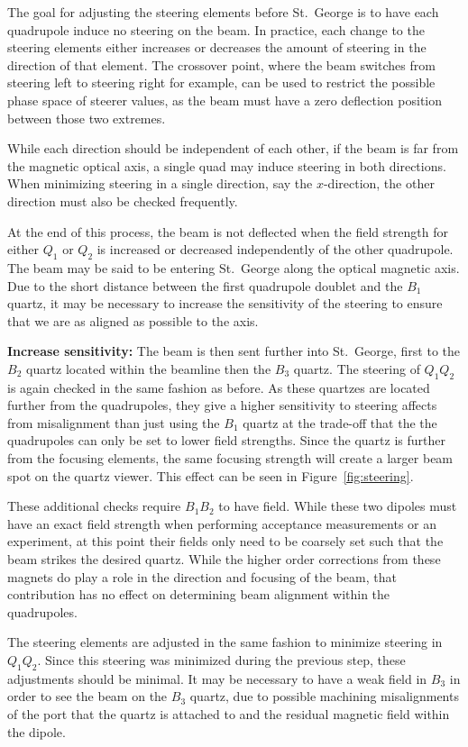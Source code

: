 The goal for adjusting the steering elements before St.\ George is to have each
quadrupole induce no steering on the beam. In practice, each change to the
steering elements either increases or decreases the amount of steering in the
direction of that element.
The crossover point, where the beam switches from steering left to steering
right for example, can be used to restrict the possible phase space of steerer
values, as the beam must have a zero deflection position between those two
extremes.

While each direction should be independent of each other, if the beam is far
from the magnetic optical axis, a single quad may induce steering in both
directions. When minimizing steering in a single direction, say the
$x$-direction, the other direction must also be checked frequently.

At the end of this process, the beam is not deflected when the field strength
for either $Q_1$ or $Q_2$ is increased or decreased independently of the other
quadrupole. The beam may be said to be entering St.\ George along the optical
magnetic axis. Due to the short distance between the first quadrupole doublet
and the $B_1$ quartz, it may be necessary to increase the sensitivity of the
steering to ensure that we are as aligned as possible to the axis.

\textbf{Increase sensitivity:}
The beam is then sent further into St.\ George, first to the $B_2$ quartz
located within the beamline then the $B_3$ quartz. The steering of $Q_1Q_2$ is
again checked in the same fashion as before. As these quartzes are located
further from the quadrupoles, they give a higher sensitivity to steering
affects from misalignment than just using the $B_1$ quartz at the trade-off
that the the quadrupoles can only be set to lower field strengths. Since the
quartz is further from the focusing elements, the same focusing strength will
create a larger beam spot on the quartz viewer. This effect can be seen in
Figure~\ref{fig:steering}.

These additional checks require $B_1B_2$ to have field. While these two dipoles
must have an exact field strength when performing acceptance measurements or an
experiment, at this point their fields only need to be coarsely set such that
the beam strikes the desired quartz. While the higher order corrections from
these magnets do play a role in the direction and focusing of the beam, that
contribution has no effect on determining beam alignment within the
quadrupoles.

The steering elements are adjusted in the same fashion to minimize steering in
$Q_1Q_2$. Since this steering was minimized during the previous step, these
adjustments should be minimal. It may
be necessary to have a weak field in $B_3$ in order to see the beam on the
$B_3$ quartz, due to possible machining misalignments of the port that the
quartz is attached to and the residual magnetic field within the dipole.

